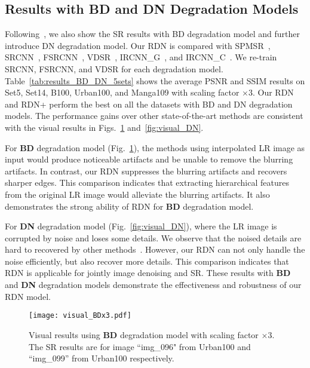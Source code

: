 \documentclass[10pt,twocolumn,letterpaper]{article}
\begin{document}
\subsection{Results with BD and DN Degradation Models}
\label{subsec:BD-DN-degradation}
Following~\cite{zhang2017learning}, we also show the SR results with BD degradation model and further introduce DN degradation model. Our RDN is compared with SPMSR~\cite{peleg2014statistical}, SRCNN~\cite{dong2016image}, FSRCNN~\cite{dong2016accelerating}, VDSR~\cite{kim2016accurate}, IRCNN\_G~\cite{zhang2017learning}, and IRCNN\_C~\cite{zhang2017learning}. We re-train SRCNN, FSRCNN, and VDSR for each degradation model. Table~\ref{tab:results_BD_DN_5sets} shows the average PSNR and SSIM results on Set5, Set14, B100, Urban100, and Manga109 with scaling factor $\times3$. Our RDN and RDN+ perform the best on all the datasets with BD and DN degradation models. The performance gains over other state-of-the-art methods are consistent with the visual results in Figs.~\ref{fig:visual_BD} and~\ref{fig:visual_DN}. 

For \textbf{BD} degradation model (Fig.~\ref{fig:visual_BD}), the methods using interpolated LR image as input would produce noticeable artifacts and be unable to remove the blurring artifacts. In contrast, our RDN suppresses the blurring artifacts and recovers sharper edges. This comparison indicates that extracting hierarchical features from the original LR image would alleviate the blurring artifacts. It also demonstrates the strong ability of RDN for \textbf{BD} degradation model.   

For \textbf{DN} degradation model (Fig.~\ref{fig:visual_DN}), where the LR image is corrupted by noise and loses some details. We observe that the noised details are hard to recovered by other methods~\cite{dong2016image,kim2016accurate,zhang2017learning}. However, our RDN can not only handle the noise efficiently, but also recover more details. This comparison indicates that RDN is applicable for jointly image denoising and SR. These results with \textbf{BD} and \textbf{DN} degradation models demonstrate the effectiveness and robustness of our RDN model. 
\vspace{-3mm}
\begin{figure}[htbp]
\centering
\texttt{[image: visual\_BDx3.pdf]}
\caption{Visual results using \textbf{BD} degradation model with scaling factor $\times3$. The SR results are for image ``img\_096" from Urban100 and ``img\_099'' from Urban100 respectively.}
\label{fig:visual_BD}
\vspace{-3mm}  
\end{figure}
\end{document}
